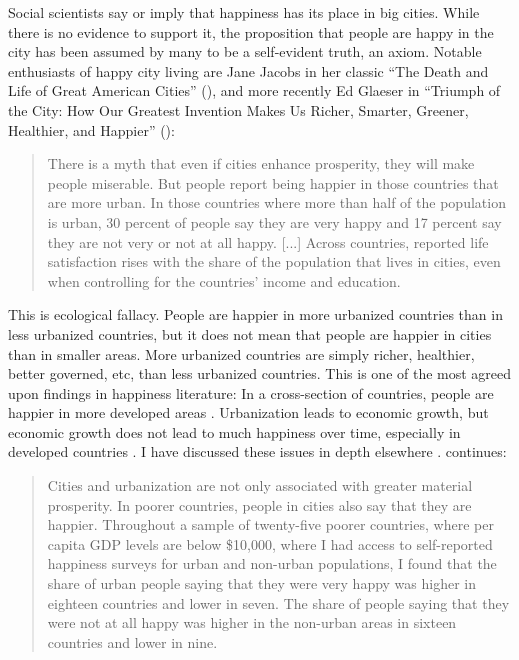\documentclass[12pt, letterpaper]{article}
\begin{document}
\begin{spacing}{1.9}
 Social scientists say or imply that happiness has its place in big cities. While there is
no evidence to support it, the proposition that people are happy in the
city has been assumed by many to be a self-evident truth,
an axiom. 
 Notable enthusiasts of happy city living are Jane Jacobs in her classic
``The Death and Life of Great American Cities'' (\citeyear{jacobs93}),
and more recently Ed Glaeser in  ``Triumph of the City: How Our Greatest
Invention Makes Us Richer, Smarter, Greener, Healthier, and
Happier'' (\citeyear{glaeser11}):  

\begin{quote}
There is a myth that even if cities enhance prosperity, they will make
people miserable. But people report being happier in those countries
that are more urban. In those countries where more than half of the
population is urban, 30 percent of people say they are very happy and
17 percent say they are not very or not at all happy. [...] Across
countries, reported life satisfaction rises with the share of the
population that lives in cities, even when controlling for the
countries' income and education.
\end{quote}
This is  ecological fallacy.  People are
happier in more urbanized countries than in less urbanized countries, but it  
 does not mean that people are happier in cities than in smaller
 areas. More urbanized countries are simply richer, healthier, better governed,
 etc, than less urbanized
 countries. This is one of the most agreed upon findings in
 happiness literature: In a cross-section of countries, people are
 happier in more developed areas \citep[e.g.,][]{aok13liavbility}. 
 Urbanization leads to economic growth, but  economic growth does
 not lead to much happiness over time, especially in developed countries \citep{easterlin13}. 
 I have discussed these issues in depth elsewhere \citep{aokCityBook15}.
   \citet{glaeser11} continues:
\begin{quote}
Cities and urbanization are not only associated with greater material
prosperity. In poorer countries, people in cities also say that they
are happier. Throughout a sample of twenty-five poorer countries,
where per capita GDP levels are below \$10,000, where I had access to
self-reported happiness surveys for urban and non-urban populations, I
found that the share of urban people saying that they were very happy
was higher in eighteen countries and lower in seven. The share of
people saying that they were not at all happy was higher in the
non-urban areas in sixteen countries and lower in nine.

\end{quote}
\end{spacing}
\end{document}
